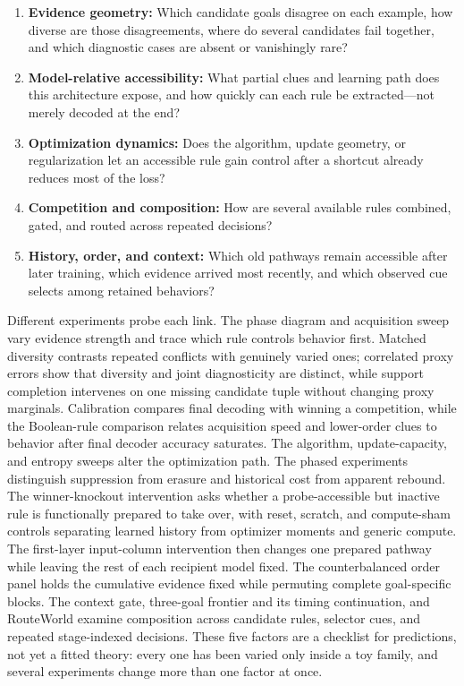 \documentclass[11pt,a4paper]{article}
\begin{document}
\begin{enumerate}[leftmargin=*,itemsep=0.35em]
  \item \textbf{Evidence geometry:} Which candidate goals disagree on each example, how diverse are those disagreements, where do several candidates fail together, and which diagnostic cases are absent or vanishingly rare?
  \item \textbf{Model-relative accessibility:} What partial clues and learning path does this architecture expose, and how quickly can each rule be extracted---not merely decoded at the end?
  \item \textbf{Optimization dynamics:} Does the algorithm, update geometry, or regularization let an accessible rule gain control after a shortcut already reduces most of the loss?
  \item \textbf{Competition and composition:} How are several available rules combined, gated, and routed across repeated decisions?
  \item \textbf{History, order, and context:} Which old pathways remain accessible after later training, which evidence arrived most recently, and which observed cue selects among retained behaviors?
\end{enumerate}

Different experiments probe each link. The phase diagram and acquisition sweep vary evidence strength and trace which rule controls behavior first. Matched diversity contrasts repeated conflicts with genuinely varied ones; correlated proxy errors show that diversity and joint diagnosticity are distinct, while support completion intervenes on one missing candidate tuple without changing proxy marginals. Calibration compares final decoding with winning a competition, while the Boolean-rule comparison relates acquisition speed and lower-order clues to behavior after final decoder accuracy saturates. The algorithm, update-capacity, and entropy sweeps alter the optimization path. The phased experiments distinguish suppression from erasure and historical cost from apparent rebound. The winner-knockout intervention asks whether a probe-accessible but inactive rule is functionally prepared to take over, with reset, scratch, and compute-sham controls separating learned history from optimizer moments and generic compute. The first-layer input-column intervention then changes one prepared pathway while leaving the rest of each recipient model fixed. The counterbalanced order panel holds the cumulative evidence fixed while permuting complete goal-specific blocks. The context gate, three-goal frontier and its timing continuation, and RouteWorld examine composition across candidate rules, selector cues, and repeated stage-indexed decisions. These five factors are a checklist for predictions, not yet a fitted theory: every one has been varied only inside a toy family, and several experiments change more than one factor at once.
\end{document}
